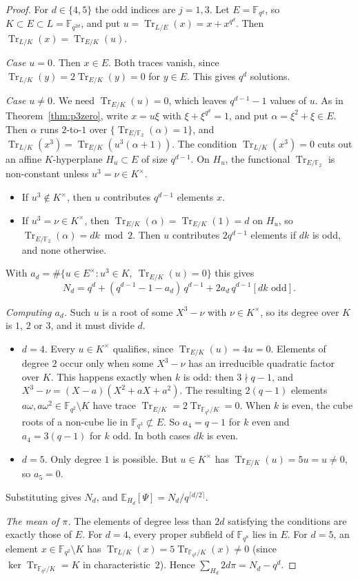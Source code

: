 \documentclass[11pt,a4paper]{amsart}
\theoremstyle{definition}
\theoremstyle{remark}
\newcommand{\F}{\mathbb{F}}
\newcommand{\Tr}{\operatorname{Tr}}
\newcommand{\E}{\mathbb{E}}
\begin{document}
\begin{proof}
For $d\in\{4,5\}$ the odd indices are $j=1,3$. Let $E=\F_{q^d}$, so $K\subset E\subset L=\F_{q^{2d}}$, and put
$u=\Tr_{L/E}(x)=x+x^{q^d}$. Then $\Tr_{L/K}(x)=\Tr_{E/K}(u)$.

\emph{Case $u=0$.} Then $x\in E$. Both traces vanish, since $\Tr_{L/K}(y)=2\Tr_{E/K}(y)=0$ for $y\in E$. This gives
$q^d$ solutions.

\emph{Case $u\ne0$.} We need $\Tr_{E/K}(u)=0$, which leaves $q^{d-1}-1$ values of $u$. As in Theorem~\ref{thm:p3zero},
write $x=u\xi$ with $\xi+\xi^{q^d}=1$, and put $\alpha=\xi^2+\xi\in E$. Then $\alpha$ runs $2$-to-$1$ over
$\{\Tr_{E/\F_2}(\alpha)=1\}$, and $\Tr_{L/K}(x^3)=\Tr_{E/K}(u^3(\alpha+1))$. The condition $\Tr_{L/K}(x^3)=0$ cuts out
an affine $K$-hyperplane $H_u\subset E$ of size $q^{d-1}$. On $H_u$, the functional $\Tr_{E/\F_2}$ is non-constant
unless $u^3=\nu\in K^\times$.
\begin{itemize}
\item If $u^3\notin K^\times$, then $u$ contributes $q^{d-1}$ elements $x$.
\item If $u^3=\nu\in K^\times$, then $\Tr_{E/K}(\alpha)=\Tr_{E/K}(1)=d$ on $H_u$, so
$\Tr_{E/\F_2}(\alpha)=dk\bmod2$. Then $u$ contributes $2q^{d-1}$ elements if $dk$ is odd, and none otherwise.
\end{itemize}
With $a_d=\#\{u\in E^\times:u^3\in K,\ \Tr_{E/K}(u)=0\}$ this gives
\[
N_d=q^d+(q^{d-1}-1-a_d)\,q^{d-1}+2a_d\,q^{d-1}[dk\text{ odd}].
\]

\emph{Computing $a_d$.} Such $u$ is a root of some $X^3-\nu$ with $\nu\in K^\times$, so its degree over $K$ is $1$, $2$
or $3$, and it must divide $d$.
\begin{itemize}
\item $d=4$. Every $u\in K^\times$ qualifies, since $\Tr_{E/K}(u)=4u=0$. Elements of degree $2$ occur only when some
$X^3-\nu$ has an irreducible quadratic factor over $K$. This happens exactly when $k$ is odd: then $3\nmid q-1$,
and $X^3-\nu=(X-a)(X^2+aX+a^2)$. The resulting $2(q-1)$ elements $a\omega,a\omega^2\in\F_{q^2}\setminus K$ have trace
$\Tr_{E/K}=2\Tr_{\F_{q^2}/K}=0$. When $k$ is even, the cube roots of a non-cube lie in $\F_{q^3}\not\subset E$. So
$a_4=q-1$ for $k$ even and $a_4=3(q-1)$ for $k$ odd. In both cases $dk$ is even.
\item $d=5$. Only degree $1$ is possible. But $u\in K^\times$ has $\Tr_{E/K}(u)=5u=u\ne0$, so $a_5=0$.
\end{itemize}
Substituting gives $N_d$, and $\E_{H_d}[\Psi]=N_d/q^{\lceil d/2\rceil}$.

\emph{The mean of $\pi$.} The elements of degree less than $2d$ satisfying the conditions are exactly those of $E$.
For $d=4$, every proper subfield of $\F_{q^8}$ lies in $E$. For $d=5$, an element $x\in\F_{q^2}\setminus K$ has
$\Tr_{L/K}(x)=5\Tr_{\F_{q^2}/K}(x)\ne0$ (since $\ker\Tr_{\F_{q^2}/K}=K$ in characteristic~$2$). Hence $\sum_{H_d}2d\pi=N_d-q^d$.
\end{proof}
\end{document}
